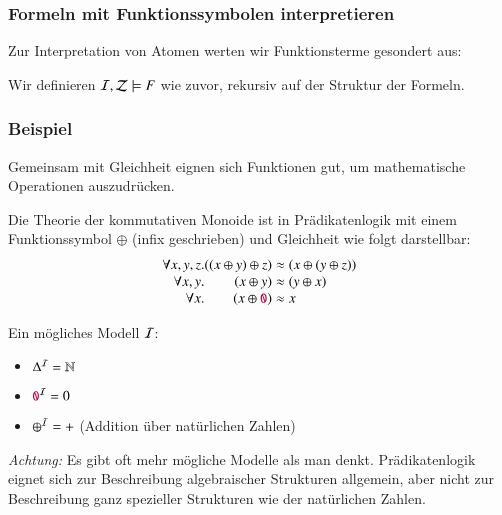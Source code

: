 \documentclass[aspectratio=1610,onlymath]{beamer}
\begin{document}
\begin{frame}\frametitle{Formeln mit Funktionssymbolen interpretieren}

Zur Interpretation von Atomen werten wir Funktionsterme gesondert aus:

\bigskip

Wir definieren $\mathcal{I},\mathcal{Z}\models F$ wie zuvor, rekursiv auf der Struktur
der Formeln.

\end{frame}

\begin{frame}\frametitle{Beispiel}

Gemeinsam mit Gleichheit eignen sich Funktionen gut, um mathematische Operationen auszudrücken.
\bigskip

Die Theorie der kommutativen Monoide ist in Prädikatenlogik mit einem Funktionssymbol $\oplus$ (infix geschrieben) und Gleichheit  wie folgt darstellbar:
\[\begin{array}{r@{}r@{}l}
\forall x,y,z.& ((x\oplus y)\oplus z) &{}\approx(x\oplus (y\oplus z))\\
\forall x,y.& (x\oplus y)& {}\approx(y\oplus x)\\
\forall x.& (x\oplus\Sterm{0})& {}\approx x
\end{array}\]

Ein mögliches Modell $\mathcal{I}$:
\begin{itemize}
\item $\Delta^{\mathcal{I}}=\mathbb{N}$
\item $\mathtt{\textcolor{purple}{0}}^{\mathcal{I}}=0$
\item ${\oplus^{\mathcal{I}}}={+}$ (Addition über natürlichen Zahlen)
\end{itemize}\bigskip

{\tiny
\emph{Achtung:} Es gibt oft mehr mögliche Modelle als man denkt. Prädikatenlogik eignet sich zur Beschreibung algebraischer Strukturen allgemein, aber nicht zur Beschreibung ganz
spezieller Strukturen wie der natürlichen Zahlen.

}

\end{frame}
\end{document}
